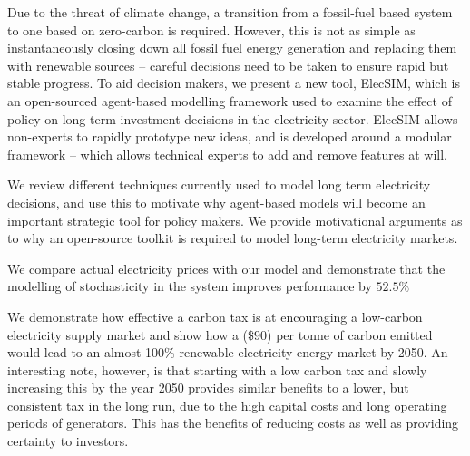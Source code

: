 Due to the threat of climate change, a transition from a fossil-fuel based system to one based on zero-carbon is required. However, this is not as simple as instantaneously closing down all fossil fuel energy generation and replacing them with renewable sources -- careful decisions need to be taken to ensure rapid but stable progress. To aid decision makers, we present a new tool, ElecSIM, which is an open-sourced agent-based modelling framework used to examine the effect of policy on long term investment decisions in the electricity sector. ElecSIM allows non-experts to rapidly prototype new ideas, and is developed around a modular framework -- which allows technical experts to add and remove features at will. 



We review different techniques currently used to model long term electricity decisions, and use this to motivate why agent-based models will become an important strategic tool for policy makers. We provide motivational arguments as to why an open-source toolkit is required to model long-term electricity markets.

We compare actual electricity prices with our model and demonstrate that the modelling of stochasticity in the system improves performance by $52.5\%$

We demonstrate how effective a carbon tax is at encouraging a low-carbon electricity supply market and show how a  ($\$90$) per tonne of carbon emitted would lead to an almost 100\% renewable electricity energy market by 2050. An interesting note, however, is that starting with a low carbon tax and slowly increasing this by the year 2050 provides similar benefits to a lower, but consistent tax in the long run, due to the high capital costs and long operating periods of generators. This has the benefits of reducing costs as well as providing certainty to investors.
